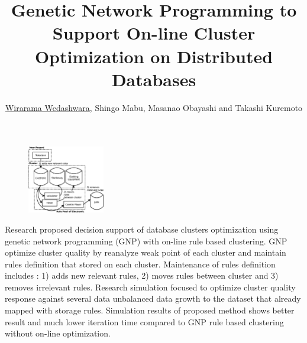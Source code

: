 \documentclass{article}
\title{Genetic Network Programming to Support On-line Cluster Optimization on Distributed Databases}
\author{\underline{Wirarama Wedashwara}, Shingo Mabu, Masanao Obayashi and Takashi Kuremoto}
\begin{document}
\maketitle

\begin{figure}
\vspace{-.7cm}
  \begin{center}
    \includegraphics[width=0.3\textwidth]{mainpic}
  \end{center}
\end{figure}

Research proposed decision support of database clusters optimization using genetic network programming (GNP) with on-line rule based clustering. GNP optimize cluster quality by reanalyze weak point of each cluster and maintain rules definition that stored on each cluster. Maintenance of rules definition includes : 1) adds new relevant rules, 2) moves rules between cluster and 3) removes irrelevant rules. Research simulation focused to optimize cluster quality response against several data unbalanced data growth to the dataset that already mapped with storage rules. Simulation results of proposed method shows better result and much lower iteration time compared to GNP rule based clustering without on-line optimization.
\end{document}
